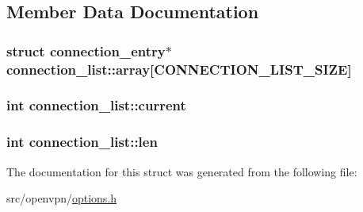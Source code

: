 \subsection{Member Data Documentation}
\hypertarget{structconnection__list_a57ecc9c713fcb3c347253dd3d86308b5}{}
\subsubsection[{array}]{\setlength{\rightskip}{0pt plus 5cm}struct {\bf connection\+\_\+entry}$\ast$ connection\+\_\+list\+::array\mbox{[}{\bf C\+O\+N\+N\+E\+C\+T\+I\+O\+N\+\_\+\+L\+I\+S\+T\+\_\+\+S\+I\+Z\+E}\mbox{]}}\label{structconnection__list_a57ecc9c713fcb3c347253dd3d86308b5}
\hypertarget{structconnection__list_a4c93ccd743bba6ee89f05abc2b3008b0}{}
\subsubsection[{current}]{\setlength{\rightskip}{0pt plus 5cm}int connection\+\_\+list\+::current}\label{structconnection__list_a4c93ccd743bba6ee89f05abc2b3008b0}
\hypertarget{structconnection__list_a7ec9bc2e47f7ac458a6a1ae17d0cf304}{}
\subsubsection[{len}]{\setlength{\rightskip}{0pt plus 5cm}int connection\+\_\+list\+::len}\label{structconnection__list_a7ec9bc2e47f7ac458a6a1ae17d0cf304}


The documentation for this struct was generated from the following file\+:\begin{DoxyCompactItemize}
\item 
src/openvpn/\hyperlink{options_8h}{options.\+h}\end{DoxyCompactItemize}
